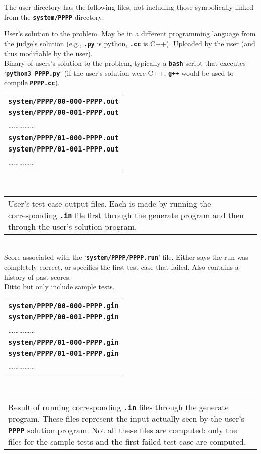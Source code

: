 \documentclass[12pt]{article}
\newcommand{\TT}[1]{{\tt \bfseries #1}}
\newenvironment{indpar}[1][0.4in]%
	{\begin{list}{}%
		     {\setlength{\itemsep}{0in}%
		      \setlength{\topsep}{0in}%
		      \setlength{\parsep}{1ex}%
		      \setlength{\labelwidth}{#1}%
		      \setlength{\leftmargin}{#1}%
		      \addtolength{\leftmargin}{\labelsep}}%
	 \item}%
	{\end{list}}
\newcommand{\ITEM}{\hspace*{-0.2in}}
\begin{document}
The user directory has the following files, not including
those symbolically linked from the \TT{system/PPPP} directory:

\begin{indpar}
\ITEM\TT{system/PPPP/PPPP.py}  User's solution to the problem.
    May be in a different programming language from the judge's
    solution (e.g., \TT{.py} is python, \TT{.cc} is C++).
    Uploaded by the user (and thus modifiable by the user).
\\
\ITEM\TT{system/PPPP/PPPP}  Binary of users's solution to the problem,
    typically a \TT{bash} script that executes `\TT{python3 PPPP.py}'
    (if the user's solution were C++, \TT{g++} would be used to
    compile \TT{PPPP.cc}).
\\[1ex]
\ITEM\begin{tabular}[t]{@{}l}
     \TT{system/PPPP/00-000-PPPP.out} \\
     \TT{system/PPPP/00-001-PPPP.out} \\
     \ldots\ldots\ldots\ldots\ldots \\
     \TT{system/PPPP/01-000-PPPP.out} \\
     \TT{system/PPPP/01-001-PPPP.out} \\
     \ldots\ldots\ldots\ldots\ldots \\
     \end{tabular}
     ~~~~
     \begin{tabular}[t]{p{3in}}
     User's test case output files.  Each is made by running
     the corresponding \TT{.in} file first through the generate
     program and then through the user's solution program.
     \end{tabular}
\\
\ITEM\TT{system/PPPP/PPPP.score}  Score associated with
    the `\TT{system/PPPP/PPPP.run}' file.  Either says the run was completely
    correct, or specifies the first test case that failed.
    Also contains a history of past scores.
\\
\ITEM\TT{system/PPPP/sample-PPPP.score}  Ditto but only include sample tests.
\\[1ex]
\ITEM\begin{tabular}[t]{@{}l}
     \TT{system/PPPP/00-000-PPPP.gin} \\
     \TT{system/PPPP/00-001-PPPP.gin} \\
     \ldots\ldots\ldots\ldots\ldots \\
     \TT{system/PPPP/01-000-PPPP.gin} \\
     \TT{system/PPPP/01-001-PPPP.gin} \\
     \ldots\ldots\ldots\ldots\ldots \\
     \end{tabular}
     ~~~~
     \begin{tabular}[t]{p{3in}}
     Result of running corresponding \TT{.in} files through the 
     generate program.  These files represent the input actually
     seen by the user's \TT{PPPP} solution program.  Not all
     these files are computed: only the files for the sample
     tests and the first failed test case are computed.
     \end{tabular}

\end{indpar}
\end{document}
